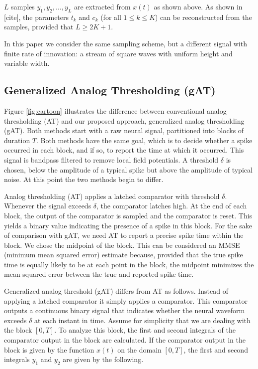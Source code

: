\documentclass[journal]{IEEEtran}
\begin{document}
$L$ samples $y_1, y_2, \ldots, y_L$ are extracted from $x(t)$ as shown above. As shown in [cite], the parameters $t_k$ and $c_k$ (for all $1 \le k \le K$) can be reconstructed from the samples, provided that $L \ge 2K+1$.

In this paper we consider the same sampling scheme, but a different signal with finite rate of innovation: a stream of square waves with uniform height and variable width.

\subsection{Generalized Analog Thresholding (gAT)}

Figure \ref{fig:cartoon} illustrates the difference between conventional analog thresholding (AT) and our proposed approach, generalized analog thresholding (gAT). Both methods start with a raw neural signal, partitioned into blocks of duration $T$. Both methods have the same goal, which is to decide whether a spike occurred in each block, and if so, to report the time at which it occurred. This signal is bandpass filtered to remove local field potentials. A threshold $\delta$ is chosen, below the amplitude of a typical spike but above the amplitude of typical noise. At this point the two methods begin to differ.

Analog thresholding (AT) applies a latched comparator with threshold $\delta$. Whenever the signal exceeds $\delta$, the comparator latches high. At the end of each block, the output of the comparator is sampled and the comparator is reset. This yields a binary value indicating the presence of a spike in this block. For the sake of comparison with gAT, we need AT to report a precise spike time within the block. We chose the midpoint of the block. This can be considered an MMSE (minimum mean squared error) estimate because, provided that the true spike time is equally likely to be at each point in the block, the midpoint minimizes the mean squared error between the true and reported spike time.

Generalized analog threshold (gAT) differs from AT as follows. Instead of applying a latched comparator it simply applies a comparator. This comparator outputs a continuous binary signal that indicates whether the neural waveform exceeds $\delta$ at each instant in time. Assume for simplicity that we are dealing with the block $[0,T]$. To analyze this block, the first and second integrals of the comparator output in the block are calculated. If the comparator output in the block is given by the function $x(t)$ on the domain $[0,T]$, the first and second integrals $y_1$ and $y_2$ are given by the following.
\end{document}
